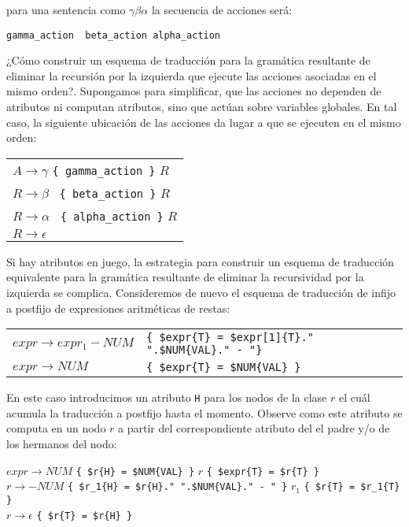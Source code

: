 \noindent para una sentencia como $\gamma \beta \alpha$ la secuencia de
acciones será: 

\begin{center}
\verb|gamma_action  beta_action alpha_action|
\end{center}

¿Cómo construir un esquema de traducción para la gramática resultante
de eliminar la recursión por la izquierda que ejecute las acciones
asociadas en el mismo orden?. Supongamos para simplificar,
que las acciones no dependen
de atributos ni computan atributos, sino que actúan sobre
variables globales. En tal caso, la siguiente
ubicación de las acciones da lugar a que se ejecuten en el mismo
orden:

\vspace{0.25cm}
\begin{tabular}{l}
$A   \rightarrow \gamma$ \verb|{ gamma_action }| $R$\\
$R   \rightarrow \beta$ \verb| { beta_action }| $R$\\
$R   \rightarrow \alpha$ \verb| { alpha_action }| $R$\\
$R   \rightarrow \epsilon$  
\end{tabular}

Si hay atributos en juego, la estrategia para construir un
esquema de traducción equivalente para la gramática resultante
de eliminar la recursividad por la izquierda se complica.
Consideremos de nuevo el esquema de traducción de infijo a
postfijo de expresiones aritméticas de restas:

\vspace{0.5cm}
\begin{tabular}{ll}
$expr   \rightarrow expr_1  -  NUM$  & \verb|{ $expr{T} = $expr[1]{T}." ".$NUM{VAL}." - "}| \\
$expr   \rightarrow NUM$             & \verb|{ $expr{T} = $NUM{VAL} }|
\end{tabular}
\vspace{0.5cm}

En este caso introducimos un atributo \verb|H| para los nodos de la clase
$r$ el cuál 
acumula la traducción a postfijo hasta el momento. Observe como
este atributo se computa en un nodo $r$ a partir del
correspondiente atributo del el padre y/o de los hermanos del nodo:

\vspace{0.5cm}
\noindent
$expr   \rightarrow NUM$ \verb|{ $r{H} = $NUM{VAL} }|  $r$ \verb|{ $expr{T} = $r{T} }| \\
$r   \rightarrow - NUM$ \verb|{ $r_1{H} = $r{H}." ".$NUM{VAL}." - " }| $r_1$ \verb|{ $r{T} = $r_1{T} }|\\
$r \rightarrow \epsilon$ \verb|{ $r{T} = $r{H} }|
\vspace{0.5cm}


